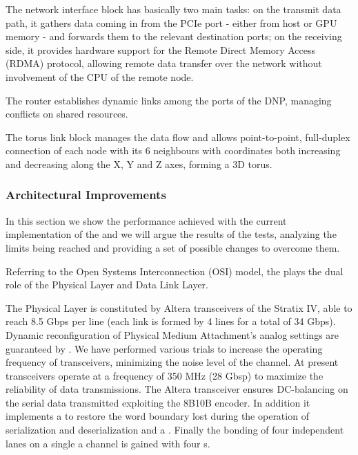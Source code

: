 The network interface block has basically two main tasks: on the
transmit data path, it gathers data coming in from the PCIe port -
either from host or GPU memory - and forwards them to the relevant
destination ports; on the receiving side, it provides hardware support
for the Remote Direct Memory Access (RDMA) protocol, allowing remote
data transfer over the network without involvement of the CPU of the
remote node.

The router establishes dynamic links among the ports of the DNP,
managing conflicts on shared resources.

The torus link block manages the data flow and allows point-to-point,
full-duplex connection of each node with its 6 neighbours with
coordinates both increasing and decreasing along the X, Y and Z axes,
forming a 3D torus.

\subsubsection{Architectural Improvements}
 \label{subsec:arch_impr}



   \label{sec:link_bw_lat}
In this section we show the performance achieved with the current
implementation of the  and we will argue the results of
the tests, analyzing the limits being reached and providing a set of
possible changes to overcome them.


Referring to the Open Systems Interconnection (OSI) model, the
 plays the dual role of the Physical Layer and Data
Link Layer.


The Physical Layer is constituted by Altera transceivers of the
Stratix IV, able to reach 8.5 Gbps per line (each link is formed by 4
lines for a total of 34 Gbps).
Dynamic reconfiguration of Physical Medium Attachment's analog
settings are guaranteed by .
We have performed various trials to increase the operating frequency
of transceivers, minimizing the noise level of the channel. At present
transceivers operate at a frequency of 350 MHz (28 Gbsp) to maximize
the reliability of data transmissions.
The Altera transceiver ensures DC-balancing on the serial data
transmitted exploiting the 8B10B encoder. In addition it implements a
 to restore the word boundary lost during the
operation of serialization and deserialization and a .
Finally the bonding of four independent lanes on a single a channel is
gained with four s.


